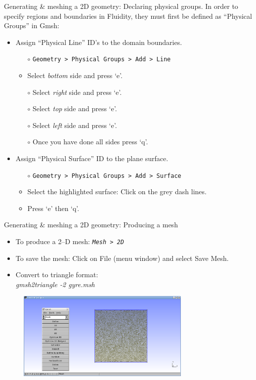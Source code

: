 \documentclass[t]{beamer}
\begin{document}
\begin{frame}{Generating \& meshing a 2D geometry: Declaring physical groups.}
In order to specify regions and boundaries in Fluidity, they must first be defined as ``Physical Groups'' in Gmsh:\\[15pt]

\begin{itemize}
   \item Assign ``Physical Line'' ID's to the domain boundaries.
   \begin{itemize}
      \item[$\circ$] \lstinline{Geometry > Physical Groups > Add > Line}
      \item[$\circ$] Select \emph{bottom} side and press `e'.
      \item[$\circ$] Select \emph{right} side and press `e'.
      \item[$\circ$] Select \emph{top} side and press `e'.
      \item[$\circ$] Select \emph{left} side and press `e'.
      \item[$\circ$] Once you have done all sides press `q'.\\[15pt]
   \end{itemize}
   \item Assign ``Physical Surface'' ID to the plane surface.
   \begin{itemize}
      \item[$\circ$] \lstinline{Geometry > Physical Groups > Add > Surface}
      \item[$\circ$] Select the highlighted surface: Click on the grey dash lines.
      \item[$\circ$] Press `e' then `q'.
   \end{itemize}
\end{itemize}
\end{frame}

\begin{frame}{Generating \& meshing a 2D geometry: Producing a mesh}
   \begin{itemize}
      \item To produce a 2--D mesh: \emph{ \lstinline{Mesh > 2D}}
      \item To save the mesh: Click on File (menu window) and select Save Mesh.
      \item Convert to triangle format:\\ \emph{gmsh2triangle -2 gyre.msh}
   \end{itemize}
\begin{figure}[htbp]
 \centering
  \includegraphics[width=0.75\textwidth]{../figures/2d-example-Gmsh-mesh}
  \label{fig:shot16}
\end{figure}
\end{frame}
\end{document}
